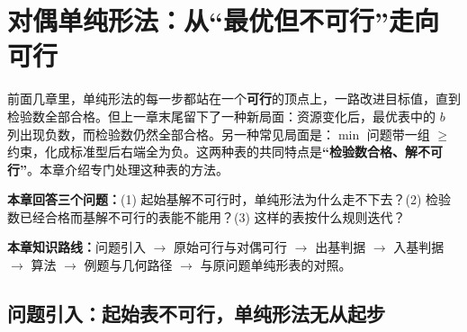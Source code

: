\section{对偶单纯形法：从“最优但不可行”走向可行}

前面几章里，单纯形法的每一步都站在一个\textbf{可行}的顶点上，一路改进目标值，直到检验数全部合格。但上一章末尾留下了一种新局面：资源变化后，最优表中的 $b$ 列出现负数，而检验数仍然全部合格。另一种常见局面是：$\min$ 问题带一组 $\ge$ 约束，化成标准型后右端全为负。这两种表的共同特点是\textbf{“检验数合格、解不可行”}。本章介绍专门处理这种表的方法。

\noindent\textbf{本章回答三个问题：}(1) 起始基解不可行时，单纯形法为什么走不下去？(2) 检验数已经合格而基解不可行的表能不能用？(3) 这样的表按什么规则迭代？\par
\noindent\textbf{本章知识路线：}问题引入 $\to$ 原始可行与对偶可行 $\to$ 出基判据 $\to$ 入基判据 $\to$ 算法 $\to$ 例题与几何路径 $\to$ 与原问题单纯形表的对照。


\subsection{问题引入：起始表不可行，单纯形法无从起步}

